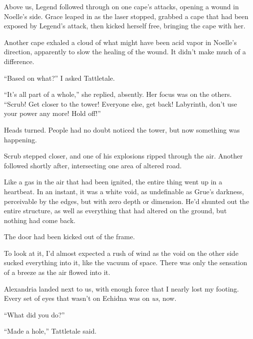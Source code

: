 Above us, Legend followed through on one cape's attacks, opening a wound in Noelle's side.  Grace leaped in as the laser stopped, grabbed a cape that had been exposed by Legend's attack, then kicked herself free, bringing the cape with her.



Another cape exhaled a cloud of what might have been acid vapor in Noelle's direction, apparently to slow the healing of the wound.  It didn't make much of a difference.



``Based on what?'' I asked Tattletale.



``It's all part of a whole,'' she replied, absently.  Her focus was on the others.  ``Scrub!  Get closer to the tower!  Everyone else, get back!  Labyrinth, don't use your power any more!  Hold off!''



Heads turned.  People had no doubt noticed the tower, but now something was happening.



Scrub stepped closer, and one of his explosions ripped through the air.  Another followed shortly after, intersecting one area of altered road.



Like a gas in the air that had been ignited, the entire thing went up in a heartbeat.  In an instant, it was a white void, as undefinable as Grue's darkness, perceivable by the edges, but with zero depth or dimension.  He'd shunted out the entire structure, as well as everything that had altered on the ground, but nothing had come back.



The door had been kicked out of the frame.



To look at it, I'd almost expected a rush of wind as the void on the other side sucked everything into it, like the vacuum of space.  There was only the sensation of a breeze as the air flowed into it.



Alexandria landed next to us, with enough force that I nearly lost my footing.  Every set of eyes that wasn't on Echidna was on \emph{us}, now.



``What did you do?''



``Made a hole,'' Tattletale said.



